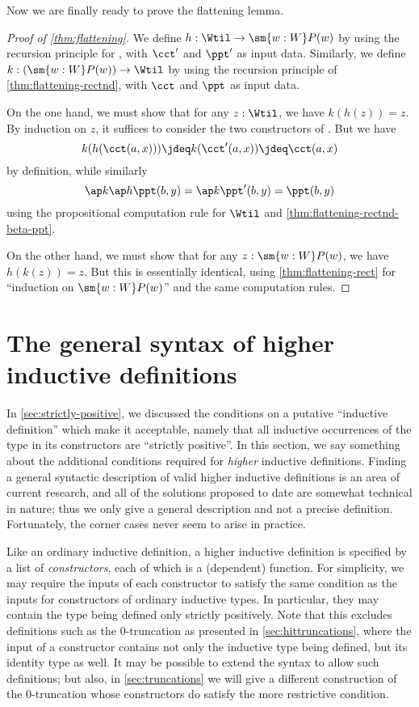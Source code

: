 Now we are finally ready to prove the flattening lemma.

\begin{proof}[Proof of \cref{thm:flattening}]
  We define $h:\Wtil \to \sm{w:W}P(w)$ by using the recursion principle for \Wtil, with $\cct'$ and $\ppt'$ as input data.
  Similarly, we define $k:(\sm{w:W}P(w)) \to \Wtil$ by using the recursion principle of \cref{thm:flattening-rectnd}, with $\cct$ and $\ppt$ as input data.

  On the one hand, we must show that for any $z:\Wtil$, we have $k(h(z))=z$.
  By induction on $z$, it suffices to consider the two constructors of \Wtil.
  But we have
  \[k(h(\cct(a,x))) \jdeq k(\cct'(a,x)) \jdeq \cct(a,x)\]
  by definition, while similarly
  \[\ap k{\ap h{\ppt(b,y)}} = \ap k{\ppt'(b,y)} = \ppt(b,y) \]
  using the propositional computation rule for $\Wtil$ and \cref{thm:flattening-rectnd-beta-ppt}.

  On the other hand, we must show that for any $z:\sm{w:W}P(w)$, we have $h(k(z))=z$.
  But this is essentially identical, using \cref{thm:flattening-rect} for ``induction on $\sm{w:W}P(w)$'' and the same computation rules.
\end{proof}

\section{The general syntax of higher inductive definitions}
\label{sec:naturality}

In \cref{sec:strictly-positive}, we discussed the conditions on a putative ``inductive definition'' which make it acceptable, namely that all inductive occurrences of the type in its constructors are ``strictly positive''.
In this section, we say something about the additional conditions required for \emph{higher} inductive definitions.
Finding a general syntactic description of valid higher inductive definitions is an area of current research, and all of the solutions proposed to date are somewhat technical in nature; thus we only give a general description and not a precise definition.
Fortunately, the corner cases never seem to arise in practice.

Like an ordinary inductive definition, a higher inductive definition is specified by a list of \emph{constructors}, each of which is a (dependent) function.
For simplicity, we may require the inputs of each constructor to satisfy the same condition as the inputs for constructors of ordinary inductive types.
In particular, they may contain the type being defined only strictly positively.
Note that this excludes definitions such as the $0$-truncation as presented in \cref{sec:hittruncations}, where the input of a constructor contains not only the inductive type being defined, but its identity type as well.
It may be possible to extend the syntax to allow such definitions; but also, in \cref{sec:truncations} we will give a different construction of the $0$-truncation whose constructors do satisfy the more restrictive condition.

